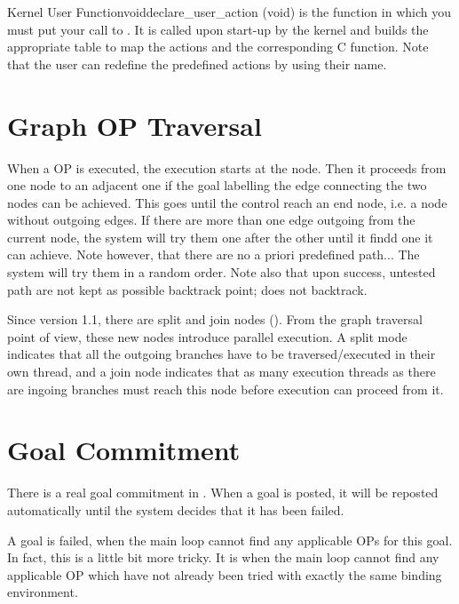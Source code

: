 \begin{typefn}{Kernel User Function}{void}{declare\_user\_action} {(void)}
is the function in which you must put your call to
. It is called upon start-up by the kernel and
builds the appropriate table to map the actions and the corresponding C
function.  Note that the user can redefine the predefined actions by using
their name.
\end{typefn}

\section{Graph OP Traversal}

When a OP is executed, the execution starts at the  node.
Then it proceeds from one node to an adjacent one if the goal labelling
the edge connecting the two nodes can be achieved. This goes until the
control reach an end node, i.e. a node without outgoing edges. If there
are more than one edge outgoing from the current node, the system will
try them one after the other until it findd one it can achieve. Note
however, that there are no a priori predefined path... The system will
try them in a random order. Note also that upon success, untested path
are not kept as possible backtrack point; \CPK{} does not backtrack.

Since version 1.1, there are split and join nodes ().  From the graph traversal point of view, these new nodes introduce
parallel execution. A split mode indicates that all the outgoing branches have
to be traversed/executed in their own thread, and a join node indicates that as
many execution threads as there are ingoing branches must reach this node
before execution can proceed from it.


\section{Goal Commitment}

There is a real goal commitment in \COPRS{}. When a goal is posted, it will be
reposted automatically until the system decides that it has been failed.

A goal is failed, when the main loop cannot find any applicable OPs
for this goal. In fact, this is a little bit more tricky. It is when the
main loop cannot find any applicable OP which have not already been tried
with exactly the same binding environment.

